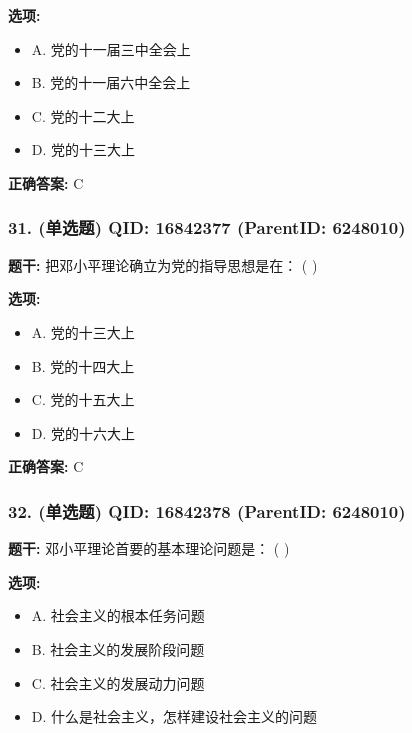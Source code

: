 \documentclass[12pt,UTF8]{ctexart}
\begin{document}
\textbf{选项:}
\begin{itemize}[leftmargin=*]

  \item A. 党的十一届三中全会上

  \item B. 党的十一届六中全会上

  \item C. 党的十二大上

  \item D. 党的十三大上

\end{itemize}

\textbf{正确答案:}
C

\vspace{0.3em}\hrulefill\vspace{0.7em}

\subsubsection*{31. (单选题) \small QID: 16842377 (ParentID: 6248010)}

\textbf{题干:}
把邓小平理论确立为党的指导思想是在： ( )



\textbf{选项:}
\begin{itemize}[leftmargin=*]

  \item A. 党的十三大上

  \item B. 党的十四大上

  \item C. 党的十五大上

  \item D. 党的十六大上

\end{itemize}

\textbf{正确答案:}
C

\vspace{0.3em}\hrulefill\vspace{0.7em}

\subsubsection*{32. (单选题) \small QID: 16842378 (ParentID: 6248010)}

\textbf{题干:}
邓小平理论首要的基本理论问题是： ( )



\textbf{选项:}
\begin{itemize}[leftmargin=*]

  \item A. 社会主义的根本任务问题

  \item B. 社会主义的发展阶段问题

  \item C. 社会主义的发展动力问题

  \item D. 什么是社会主义，怎样建设社会主义的问题

\end{itemize}
\end{document}
